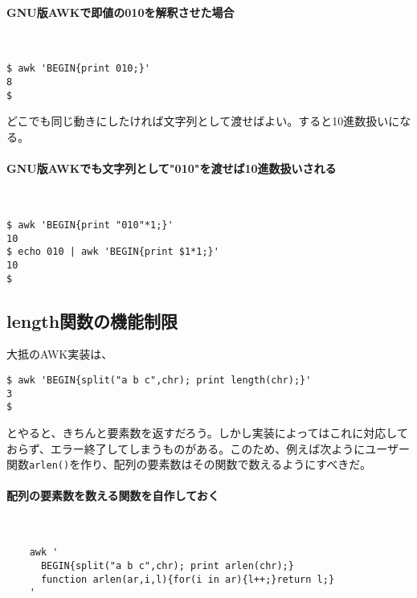 \paragraph{GNU版AWKで即値の010を解釈させた場合}　\\
\begin{screen}
	\verb|$ awk 'BEGIN{print 010;}'| \return \\
	\verb|8| \\
	\verb|$ |
\end{screen}

どこでも同じ動きにしたければ文字列として渡せばよい。すると10進数扱いになる。

\paragraph{GNU版AWKでも文字列として"010"を渡せば10進数扱いされる} 　\\
\begin{screen}
	\verb|$ awk 'BEGIN{print "010"*1;}'| \return \\
	\verb|10| \\
	\verb!$ echo 010 | awk 'BEGIN{print $1*1;}'! \return \\
	\verb|10| \\
	\verb|$ |
\end{screen}

\subsection*{length関数の機能制限}

大抵のAWK実装は、

\begin{screen}
	\verb|$ awk 'BEGIN{split("a b c",chr); print length(chr);}'| \return \\
	\verb|3| \\
	\verb|$ |
\end{screen}

とやると、きちんと要素数を返すだろう。しかし実装によってはこれに対応しておらず、エラー終了してしまうものがある。このため、例えば次ようにユーザー関数\verb|arlen()|を作り、配列の要素数はその関数で数えるようにすべきだ。

\paragraph{配列の要素数を数える関数を自作しておく} 　\\
\begin{frameboxit}{160.0mm}
\begin{verbatim}
	awk '
	  BEGIN{split("a b c",chr); print arlen(chr);}
	  function arlen(ar,i,l){for(i in ar){l++;}return l;}
	'
\end{verbatim}
\end{frameboxit}


